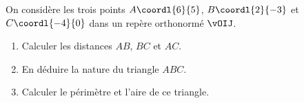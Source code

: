 \begin{exo}{}
	On considère les trois points $A\coordl{6}{5}$, $B\coordl{2}{-3}$ et $C\coordl{-4}{0}$ dans un repère orthonormé $\vOIJ$.

	\begin{enumerate}
		\item Calculer les distances $AB$, $BC$ et $AC$.
		\item En déduire la nature du triangle $ABC$.
		\item Calculer le périmètre et l'aire de ce triangle.
	\end{enumerate}
\end{exo}
